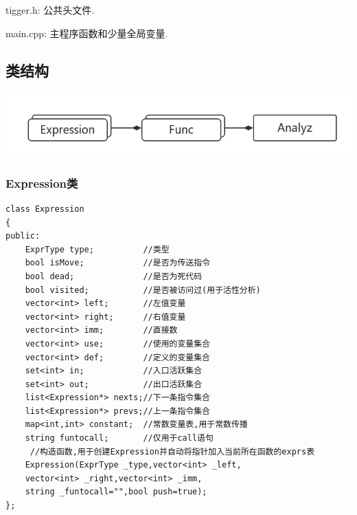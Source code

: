 \documentclass[UTF8]{article}
\begin{document}
tigger.h: 公共头文件.

main.cpp: 主程序函数和少量全局变量.
\subsection{类结构}
\includegraphics[width=0.7\linewidth]{uml} 

\subsubsection{Expression类}
\begin{lstlisting}
class Expression
{
public:
    ExprType type;          //类型
    bool isMove;            //是否为传送指令
    bool dead;              //是否为死代码
    bool visited;           //是否被访问过(用于活性分析)
    vector<int> left;       //左值变量
    vector<int> right;      //右值变量
    vector<int> imm;        //直接数
    vector<int> use;        //使用的变量集合
    vector<int> def;        //定义的变量集合
    set<int> in;            //入口活跃集合
    set<int> out;           //出口活跃集合
    list<Expression*> nexts;//下一条指令集合
    list<Expression*> prevs;//上一条指令集合
    map<int,int> constant;  //常数变量表,用于常数传播
    string funtocall;       //仅用于call语句
     //构造函数,用于创建Expression并自动将指针加入当前所在函数的exprs表
    Expression(ExprType _type,vector<int> _left,
    vector<int> _right,vector<int> _imm,
    string _funtocall="",bool push=true);
};
\end{lstlisting}
\end{document}
